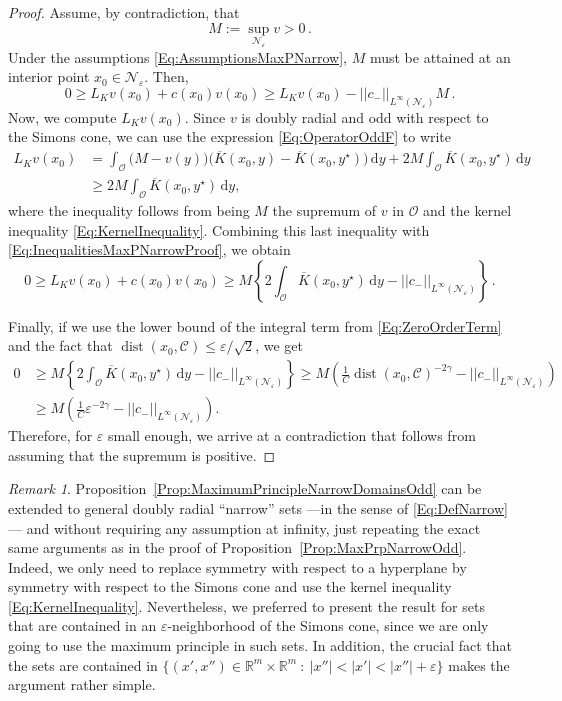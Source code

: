 \documentclass[12pt,reqno]{amsart}
\theoremstyle{definition}
\theoremstyle{remark}
\newtheorem{remark}[theorem]{Remark}
\newcommand{\con}[1]{\mathbb{#1}}
\newcommand{\R}{\con{R}} %
\newcommand{\ccal}{\mathscr{C}}
\newcommand{\ncal}{\mathcal{N}}
\newcommand{\ocal}{\mathcal{O}}
\newcommand{\norm}[1]{\left | \left |{#1} \right | \right |}
\newcommand{\s}{\gamma}
\renewcommand{\d}{\,\mathrm{d}} %
\DeclareMathOperator{\dist}{dist}
\numberwithin{equation}{section}
\begin{document}
\begin{proof}
	Assume, by contradiction, that
	$$
	M := \sup_{\ncal_\varepsilon} v > 0\,.
	$$
	Under the assumptions \eqref{Eq:AssumptionsMaxPNarrow}, $M$ must be attained at an interior point $x_0 \in \ncal_\varepsilon$. Then,
	\begin{equation}
	\label{Eq:InequalitiesMaxPNarrowProof}
	0 \geq L_K  v(x_0) + c(x_0)v(x_0) \geq L_K  v(x_0) - \norm{c_-}_{L^\infty(\ncal_\varepsilon)}M\,.
	\end{equation} 
	Now, we compute $L_K  v(x_0)$. Since $v$ is doubly radial and odd with respect to the Simons cone, we can use the expression \eqref{Eq:OperatorOddF} to write
	\begin{align*}
	L_K v(x_0) &= \int_{\ocal} \big (M - v(y) \big) \big (\overline{K}(x_0,y) -\overline{K}(x_0,y^\star)\big) \d y + 2M\int_{\ocal} \overline{K}(x_0,y^\star)\d y\\
	&\geq2M \int_{\ocal} \overline{K}(x_0,y^\star)\d y,
	\end{align*}
	where the inequality follows from being $M$ the supremum of $v$ in $\ocal$ and the kernel inequality \eqref{Eq:KernelInequality}. Combining this last inequality with \eqref{Eq:InequalitiesMaxPNarrowProof}, we obtain
	$$
	0 \geq L_K  v(x_0) + c(x_0)v(x_0)  \geq M \left\{ 2 \int_{\ocal} \overline{K}(x_0,y^\star)\d y - \norm{c_-}_{L^\infty(\ncal_\varepsilon)}
	\right\}\,.
	$$
	
	Finally, if we use the lower bound of the integral term from \eqref{Eq:ZeroOrderTerm} and the fact that $\dist(x_0,\ccal) \leq \varepsilon/\sqrt{2}$, we get
	\begin{align*}
	0 &\geq M \left\{ 2 \int_{\ocal} \overline{K}(x_0,y^\star)\d y - \norm{c_-}_{L^\infty(\ncal_\varepsilon)}
	\right\} \geq M \left(\frac{1}{C}\dist(x_0,\ccal)^{-2\s}-\norm{c_-}_{L^\infty(\ncal_\varepsilon)}\right) \\ &\geq M \left(\frac{1}{C}\varepsilon^{-2\s}-\norm{c_-}_{L^\infty(\ncal_\varepsilon)}\right).
	\end{align*}
	Therefore, for $\varepsilon$ small enough, we arrive at a contradiction that follows from assuming that the supremum is positive.
\end{proof}

\begin{remark}
	Proposition~\ref{Prop:MaximumPrincipleNarrowDomainsOdd} can be extended to general doubly radial ``narrow'' sets ---in the sense of \eqref{Eq:DefNarrow}--- and without requiring any assumption at infinity, just repeating the exact same arguments as in the proof of Proposition~\ref{Prop:MaxPrpNarrowOdd}. Indeed, we only need to replace symmetry with respect to a hyperplane by symmetry with respect to the Simons cone and use the kernel inequality \eqref{Eq:KernelInequality}. Nevertheless, we preferred to present the result for sets that are contained in an $\varepsilon$-neighborhood of the Simons cone, since we are only going to use the maximum principle in such sets. In addition, the crucial fact that the sets are contained in $\{(x',x'')\in \R^m\times\R^m \ : \ |x''|<|x'|<|x''|+ \varepsilon\}$ makes the argument rather simple.
\end{remark}
\end{document}

